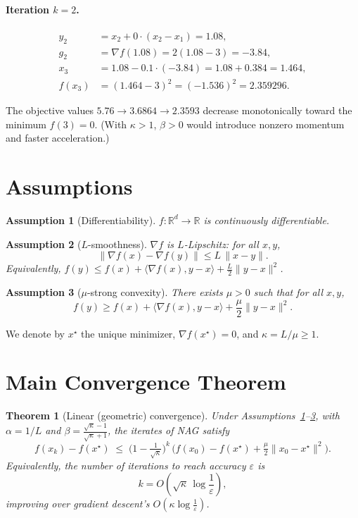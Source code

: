 \documentclass[11pt]{article}
\newtheorem{theorem}{Theorem}
\newtheorem{assumption}{Assumption}
\begin{document}
\paragraph{Iteration $k=2$.}
\begin{align*}
y_2 &= x_2 + 0\cdot(x_2-x_1) = 1.08,\\
g_2 &= \nabla f(1.08) = 2(1.08-3) = -3.84,\\
x_3 &= 1.08 - 0.1\cdot(-3.84) = 1.08 + 0.384 = 1.464,\\
f(x_3) &= (1.464-3)^2 = (-1.536)^2 = 2.359296 .
\end{align*}

The objective values $5.76 \to 3.6864 \to 2.3593$ decrease monotonically toward the minimum $f(3)=0$. (With $\kappa>1$, $\beta>0$ would introduce nonzero momentum and faster acceleration.)

\section*{Assumptions}

\begin{assumption}[Differentiability]\label{as:diff}
$f:\mathbb{R}^d\to\mathbb{R}$ is continuously differentiable.
\end{assumption}

\begin{assumption}[$L$-smoothness]\label{as:smooth}
$\nabla f$ is $L$-Lipschitz: for all $x,y$,
\[
\|\nabla f(x)-\nabla f(y)\| \le L\,\|x-y\|.
\]
Equivalently, $f(y) \le f(x) + \langle \nabla f(x), y-x\rangle + \frac{L}{2}\|y-x\|^2$.
\end{assumption}

\begin{assumption}[$\mu$-strong convexity]\label{as:sc}
There exists $\mu>0$ such that for all $x,y$,
\[
f(y) \ge f(x) + \langle \nabla f(x), y-x\rangle + \frac{\mu}{2}\|y-x\|^2.
\]
\end{assumption}

We denote by $x^\star$ the unique minimizer, $\nabla f(x^\star)=0$, and $\kappa = L/\mu \ge 1$.

\section*{Main Convergence Theorem}

\begin{theorem}[Linear (geometric) convergence]\label{thm:main}
Under Assumptions~\ref{as:diff}--\ref{as:sc}, with $\alpha = 1/L$ and
$\beta = \frac{\sqrt{\kappa}-1}{\sqrt{\kappa}+1}$, the iterates of NAG satisfy
\[
f(x_k) - f(x^\star) \;\le\; \Big(1 - \tfrac{1}{\sqrt{\kappa}}\Big)^{k}\,
\Big(f(x_0)-f(x^\star) + \tfrac{\mu}{2}\|x_0 - x^\star\|^2\Big).
\]
Equivalently, the number of iterations to reach accuracy $\varepsilon$ is
\[
k = O\!\left(\sqrt{\kappa}\,\log\frac{1}{\varepsilon}\right),
\]
improving over gradient descent's $O(\kappa\log\frac{1}{\varepsilon})$.
\end{theorem}
\end{document}
